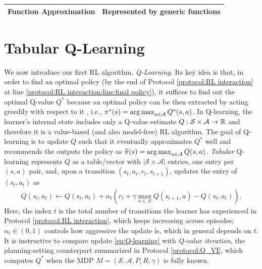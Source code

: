 \begin{table}[tb]
\begin{tabular}{|l|lll|}
Function Approximation & \multicolumn{3}{l|}{Represented by generic functions}                                                                                                                                                                                                                                   \\ \hline
\end{tabular}
\end{table}

\section{Tabular Q-Learning}
We now introduce our first RL algorithm, {\em Q-Learning}.
Its key idea is that, in order to find an optimal policy (by the end of Protocol \ref{protocol:RL interaction} at line \ref{protocol:RL interaction:line:final policy}), it suffices to find out the optimal Q-value $Q^*$ because an optimal policy can be then extracted by acting greedily with respect to it , i.e., $\pi^*(s)=\operatorname*{arg\,max}_{a\in\mathcal{A}} Q^*(s,a)$.
In Q-learning, the learner's internal state includes only a Q-value estimate $Q:\mathcal{S}\times\mathcal{A}\to\operatorname{\mathbb{R}}$ and therefore it is a value-based (and also model-free) RL algorithm.
The goal of Q-learning is to update $Q$ such that it eventually approximates $Q^*$ well and recommends the outputs the policy as $\widehat{\pi}(s) = \operatorname*{arg\,max}_{a\in\mathcal{A}}Q(s,a)$.
{\em Tabular} Q-learning represents $Q$ as a table/vector with $|\mathcal{S}\times\mathcal{A}|$ entries, one entry per $(s,a)$ pair, and, upon a transition $(s_t,a_{t},r_t,s_{t+1})$, updates the entry of $(s_t,a_t)$ as
\begin{align}
\label{eq:Q-learning}
Q(s_t,a_t) \gets Q(s_t,a_t) + \alpha_t\left(r_t+\gamma\max_{a\in\mathcal{A}}Q(s_{t+1},a)-Q(s_t,a_t) \right). 
\end{align}
Here, the index $t$ is the total number of transitions the learner has experienced in Protocol \ref{protocol:RL interaction}, which keeps increasing across episodes;
$\alpha_t\in(0,1)$ controls how aggressive the update is, which in general depends on $t$.
It is instructive to compare update \eqref{eq:Q-learning} with {\em Q-value iteration}, the planning-setting counterpart summarized in Protocol \ref{protocol:Q_VI}, which computes $Q^*$ when the MDP $M=(\mathcal{S},\mathcal{A},P,R,\gamma)$ is fully known.
